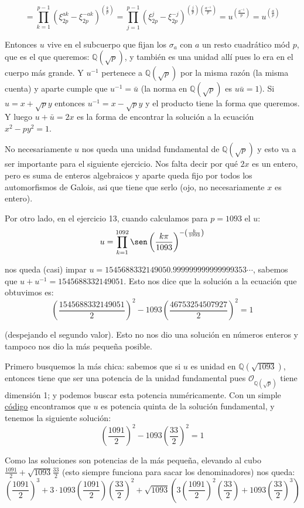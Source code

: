 \documentclass[12pt]{amsart}
\newcommand{\QQ}{\mathbb{Q}}
\newcommand{\OO}{\mathcal{O}}
\newcommand{\lp}{\left(}
\newcommand{\rp}{\right)}
\theoremstyle{plain}
\begin{document}
$$=\prod_{k=1}^{p-1} \lp\xi_{2p}^{ak}
- \xi_{2p}^{-ak}\rp^{\lp\frac{k}{p}\rp}=\prod_{j=1}^{p-1}
\lp\xi_{2p}^{j} - \xi_{2p}^{-j}\rp^
{\lp\frac{j}{p}\rp \lp\frac{a^{-1}}{p}\rp} = 
u^{\lp\frac{a^{-1}}{p}\rp} = u^{\lp\frac{a}{p}\rp}$$

Entonces $u$ vive en el subcuerpo que fijan los $\sigma_a$ con
$a$ un resto cuadrático mód $p$, que es el que queremos: 
$\QQ(\sqrt{p})$, y también es una unidad allí pues lo era en
el cuerpo más grande. Y $u^{-1}$ pertenece a $\QQ(\sqrt{p})$
por la misma razón (la misma cuenta) y aparte cumple que $u^{-1}
=\bar{u}$ (la norma en $\QQ(\sqrt{p})$ es $u\bar{u}=1$). Si 
$u=x+\sqrt{p}y$ entonces $u^{-1}=x-\sqrt{p}y$ y el producto tiene 
la forma que queremos. Y luego $u+\bar{u}=2x$ es la forma de encontrar
la solución a la ecuación $x^2-py^2=1$. 

No necesariamente $u$
nos queda una unidad fundamental de $\QQ(\sqrt{p})$ y esto
va a ser importante para el siguiente ejercicio. Nos falta 
decir por qué $2x$ es un entero, pero es suma de 
enteros algebraicos y aparte queda fijo por todos los 
automorfismos de Galois, asi que tiene que serlo (ojo, no 
necesariamente $x$ es entero).

Por otro lado, en el ejercicio 13, cuando calculamos para 
$p=1093$ el $u$:
$$u= \prod^{1092}_{k=1} \sen\lp\frac{k\pi}{1093}\rp ^{-\lp
\frac{k}{1093} \rp}$$

nos queda (casi) impar $u = 1545688332149050.999999999999999353
\cdots$, sabemos que $u+u^{-1} = 1545688332149051$. Esto nos 
dice que la solución a la ecuación que obtuvimos es:
$$\lp\frac{1545688332149051}{2}\rp^2 - 1093 
\lp\frac{46753254507927}{2}\rp^2 = 1$$

(despejando el segundo valor). Esto no nos dio una solución 
en números enteros y tampoco nos dio la más pequeña posible.

Primero busquemos la más chica: sabemos que si $u$ es unidad 
en $\QQ(\sqrt{1093})$, entonces tiene que ser una potencia de 
la unidad fundamental pues $\OO_{\QQ(\sqrt{p})}$ tiene 
dimensión 1; y podemos buscar esta potencia numéricamente.
Con un simple \hyperref[codigo3]{código} encontramos que $u$
es potencia quinta de la solución fundamental, y tenemos 
la siguiente solución:
$$\lp\frac{1091}{2}\rp^2 - 1093 \lp\frac{33}{2}\rp^2 = 1$$

Como las soluciones son potencias de la más pequeña,
elevando al cubo $\frac{1091}{2} + \sqrt{1093}
\frac{33}{2}$ (esto siempre funciona para sacar los 
denominadores) nos queda:
$$\lp\frac{1091}{2}\rp^3 +3\cdot1093
\lp\frac{1091}{2}\rp \lp\frac{33}{2}\rp^2 + \sqrt{1093} 
\lp 3\lp\frac{1091}{2}\rp^2\lp\frac{33}{2}\rp + 1093
\lp\frac{33}{2}\rp^3\rp$$
\end{document}
